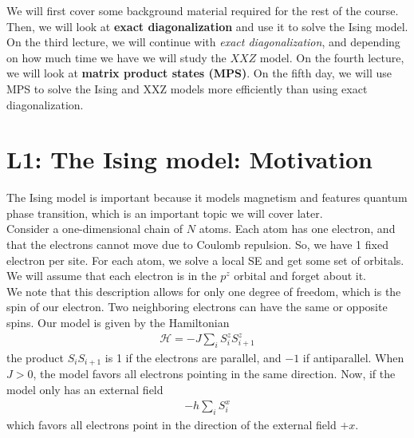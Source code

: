 \documentclass{book}
\theoremstyle{definition}
\newcommand{\had}{\mathcal{H}}
\begin{document}
We will first cover some background material required for the rest of the course. Then, we will look at \textbf{exact diagonalization} and use it to solve the Ising model. On the third lecture, we will continue with \textit{exact diagonalization}, and depending on how much time we have we will study the $XXZ$ model. On the fourth lecture, we will look at \textbf{matrix product states (MPS)}. On the fifth day, we will use MPS to solve the Ising and XXZ models more efficiently than using exact diagonalization.


\newpage
   





\section{L1: The Ising model: Motivation}

The Ising model is important because it models magnetism and features quantum phase transition, which is an important topic we will cover later.\\

Consider a one-dimensional chain of $N$ atoms. Each atom has one electron, and that the electrons cannot move due to Coulomb repulsion. So, we have 1 fixed electron per site. For each atom, we solve a local SE and get some set of orbitals. \\

We will assume that each electron is in the $p^z$ orbital and forget about it. \\

We note that this description allows for only one degree of freedom, which is the spin of our electron. Two neighboring electrons can have the same or opposite spins. Our model is given by the Hamiltonian
\begin{align}
\had = -J \sum_i S_i^z S_{i+1}^z
\end{align}
the product $S_iS_{i+1}$ is 1 if the electrons are parallel, and $-1$ if antiparallel. When $J > 0$, the model favors all electrons pointing in the same direction. Now, if the model only has an external field
\begin{align}
-h \sum_i S_i^x
\end{align}
which favors all electrons point in the direction of the external field $+x$. \\
\end{document}
